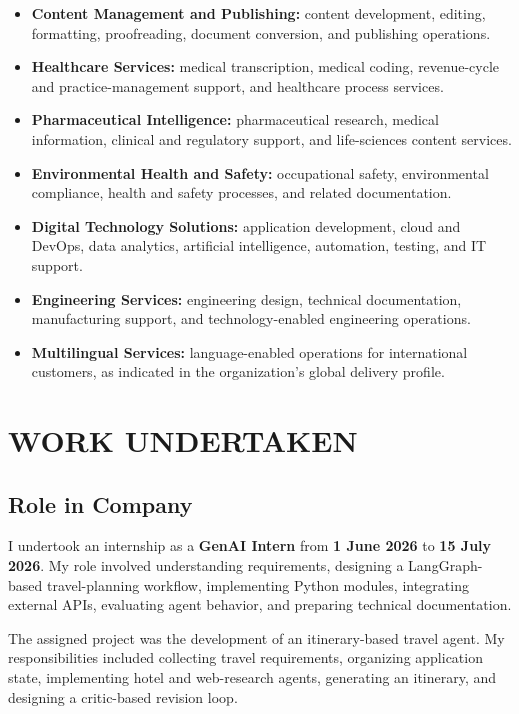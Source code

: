 \documentclass[12pt,a4paper]{report}
\begin{document}
\begin{itemize}
    \item \textbf{Content Management and Publishing:} content development, editing, formatting,
    proofreading, document conversion, and publishing operations.
    \item \textbf{Healthcare Services:} medical transcription, medical coding, revenue-cycle
    and practice-management support, and healthcare process services.
    \item \textbf{Pharmaceutical Intelligence:} pharmaceutical research, medical information,
    clinical and regulatory support, and life-sciences content services.
    \item \textbf{Environmental Health and Safety:} occupational safety, environmental
    compliance, health and safety processes, and related documentation.
    \item \textbf{Digital Technology Solutions:} application development, cloud and DevOps,
    data analytics, artificial intelligence, automation, testing, and IT support.
    \item \textbf{Engineering Services:} engineering design, technical documentation,
    manufacturing support, and technology-enabled engineering operations.
    \item \textbf{Multilingual Services:} language-enabled operations for international
    customers, as indicated in the organization's global delivery profile.
\end{itemize}


\chapter{WORK UNDERTAKEN}
\label{ch:work-undertaken}

\section{Role in Company}
\label{sec:role-in-company}
I undertook an internship as a \textbf{GenAI Intern} from \textbf{1 June 2026} to
\textbf{15 July 2026}. My role involved understanding requirements, designing a LangGraph-based
travel-planning workflow, implementing Python modules, integrating external APIs, evaluating
agent behavior, and preparing technical documentation.

The assigned project was the development of an itinerary-based travel agent. My responsibilities
included collecting travel requirements, organizing application state, implementing hotel and
web-research agents, generating an itinerary, and designing a critic-based revision loop.
\end{document}
